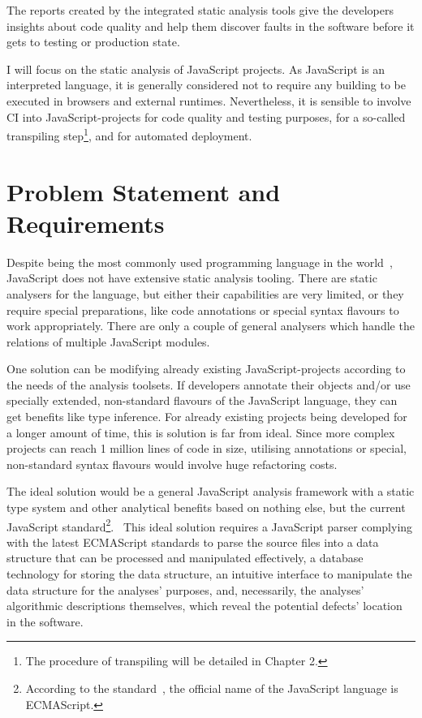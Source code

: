 The reports created by the integrated static analysis tools give the developers insights about code quality and help them discover faults in the software before it gets to testing or production state.

I will focus on the static analysis of JavaScript projects. As JavaScript is an interpreted language, it is generally considered not to require any building to be executed in browsers and external runtimes. Nevertheless, it is sensible to involve CI into JavaScript-projects for code quality and testing purposes, for a so-called transpiling step\footnote{The procedure of transpiling will be detailed in Chapter 2.}, and for automated deployment.


\section{Problem Statement and Requirements}

Despite being the most commonly used programming language in the world~\cite{javascriptstackoverflow}, JavaScript does not have extensive static analysis tooling. There are static analysers for the language, but either their capabilities are very limited, or they require special preparations, like code annotations or special syntax flavours to work appropriately. There are only a couple of general analysers which handle the relations of multiple JavaScript modules.

One solution can be modifying already existing JavaScript-projects according to the needs of the analysis toolsets. If developers annotate their objects and/or use specially extended, non-standard flavours of the JavaScript language, they can get benefits like type inference. For already existing projects being developed for a longer amount of time, this is solution is far from ideal. Since more complex projects can reach 1 million lines of code in size, utilising annotations or special, non-standard syntax flavours would involve huge refactoring costs.

The ideal solution would be a general JavaScript analysis framework with a static type system and other analytical benefits based on nothing else, but the current JavaScript standard\footnote{According to the standard~\cite{ecmascriptstandard}, the official name of the JavaScript language is ECMAScript.}.~\cite{ecmascriptstandard} This ideal solution requires a JavaScript parser complying with the latest {ECMAScript} standards to parse the source files into a data structure that can be processed and manipulated effectively, a database technology for storing the data structure, an intuitive interface to manipulate the data structure for the analyses' purposes, and, necessarily, the analyses' algorithmic descriptions themselves, which reveal the potential defects' location in the software.

